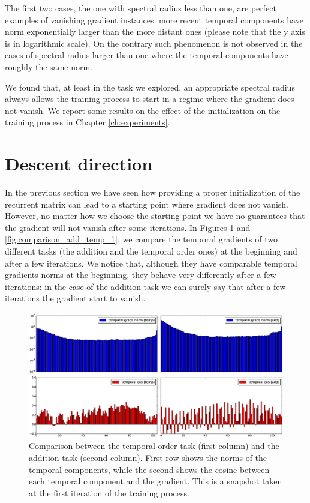 The first two cases, the one with spectral radius less than one, are perfect examples of vanishing gradient instances: more recent temporal components have norm exponentially larger than the more distant ones (please note that the y axis is in logarithmic scale). On the contrary such phenomenon is not observed in the cases of spectral radius larger than one where the temporal components have roughly the same norm.

We found that, at least in the task we explored, an appropriate spectral radius always allows the training process to start in a regime where the gradient does not vanish. We report some results on the effect of the initialization on the training process in Chapter \ref{ch:experiments}.

\section{Descent direction}
In the previous section we have seen how providing a proper initialization of the recurrent matrix can lead to a starting point where gradient does not vanish. However, no matter how we choose the starting point we have no guarantees that the gradient will not vanish after some iterations. In Figures \ref{fig:comparison_add_temp_0} and \ref{fig:comparison_add_temp_1}, we compare the temporal gradients of two different tasks (the addition and the temporal order ones) at the beginning and after a few iterations.
We notice that, although they have comparable temporal gradients norms at the beginning, they behave very differently after a few iterations: in the case of the addition task we can surely say that after a few iterations the gradient start to vanish.

\begin{figure}[h]
	\includegraphics[width=1\textwidth]{chapter3/compare_add_temp_norms_0.eps}
	\caption{Comparison between the temporal order task (first column) and the addition task (second column). First row shows the norms of the temporal components, while the second shows the cosine between each temporal component and the gradient. This is a snapshot taken at the first iteration of the training process.}
	\label{fig:comparison_add_temp_0}
\end{figure}

